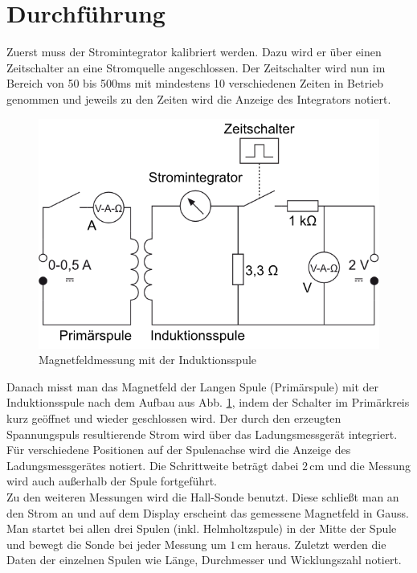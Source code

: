 \documentclass[12pt,a4paper,titlepage,headinclude,bibtotoc]{scrartcl}
\begin{document}
\section{Durchführung}
\label{sec:durchfuehrung}
Zuerst muss der Stromintegrator kalibriert werden.
Dazu wird er über einen Zeitschalter an eine Stromquelle angeschlossen.
Der Zeitschalter wird nun im Bereich von 50 bis 500ms  mit mindestens 10 verschiedenen Zeiten in Betrieb genommen und jeweils zu den Zeiten wird die Anzeige des Integrators notiert.\\
\begin{figure}[!htb]
	 \centering
	 \includegraphics[scale=1.0]{IndSpuleAufbau.png}
	\caption{Magnetfeldmessung mit der Induktionsspule \cite[Datum: 09.10.2014]{LP13}}	 
	 \label{fig:IndSpule}
\end{figure}
Danach misst man das Magnetfeld der Langen Spule (Primärspule) mit der Induktionsspule nach dem Aufbau aus Abb. \ref{fig:IndSpule}, indem der Schalter im Primärkreis kurz geöffnet und wieder geschlossen wird.
Der durch den erzeugten Spannungspuls resultierende Strom wird über das Ladungsmessgerät integriert.
Für verschiedene Positionen auf der Spulenachse wird die Anzeige des Ladungsmessgerätes notiert.
Die Schrittweite beträgt dabei $2\,$cm und die Messung wird auch außerhalb der Spule fortgeführt.\\
Zu den weiteren Messungen wird die Hall-Sonde benutzt.
Diese schließt man an den Strom an und auf dem Display erscheint das gemessene Magnetfeld in Gauss.
Man startet bei allen drei Spulen (inkl. Helmholtzspule) in der Mitte der Spule und bewegt die Sonde bei jeder Messung um $1\,$cm heraus.
Zuletzt werden die Daten der einzelnen Spulen wie Länge, Durchmesser und Wicklungszahl notiert.
\end{document}
